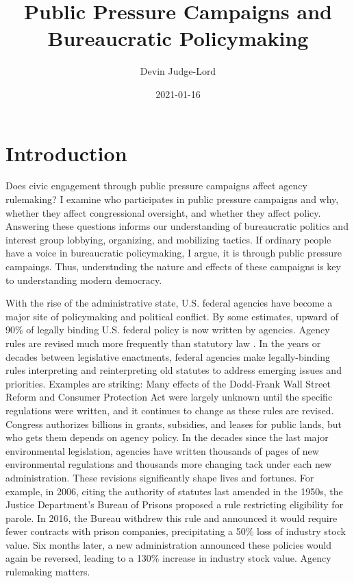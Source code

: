 \documentclass[
]{book}
\title{Public Pressure Campaigns and Bureaucratic Policymaking}
\author{Devin Judge-Lord}
\date{2021-01-16}
\begin{document}
\maketitle

{
\setcounter{tocdepth}{1}
\tableofcontents
}
\hypertarget{introduction}{%
\chapter*{Introduction}\label{introduction}}

Does civic engagement through public pressure campaigns affect agency rulemaking? I examine who participates in public pressure campaigns and why, whether they affect congressional oversight, and whether they affect policy. Answering these questions informs our understanding of bureaucratic politics and interest group lobbying, organizing, and mobilizing tactics. If ordinary people have a voice in bureaucratic policymaking, I argue, it is through public pressure campaings. Thus, understnding the nature and effects of these campaigns is key to understanding modern democracy.

With the rise of the administrative state, U.S. federal agencies have
become a major site of policymaking and political conflict. By some
estimates, upward of 90\% of legally binding U.S. federal policy is now
written by agencies. Agency rules are revised much more frequently than
statutory law \citep{Wagner2017}. In the years or decades between
legislative enactments, federal agencies make legally-binding rules
interpreting and reinterpreting old statutes to address emerging issues
and priorities. Examples are striking: Many effects of the Dodd-Frank Wall
Street Reform and Consumer Protection Act were largely unknown until the
specific regulations were written, and it continues to change as these
rules are revised. Congress authorizes billions in grants, subsidies, and
leases for public lands, but who gets them depends on agency policy. In
the decades since the last major environmental legislation, agencies
have written thousands of pages of new environmental regulations and
thousands more changing tack under each new administration. These
revisions significantly shape lives and fortunes. For example, in 2006,
citing the authority of statutes last amended in the 1950s, the Justice
Department's Bureau of Prisons proposed a rule restricting eligibility
for parole. In 2016, the Bureau withdrew this rule and announced it
would require fewer contracts with prison companies,
precipitating a 50\% loss of industry stock value. Six months later, a
new administration announced these policies would again be reversed,
leading to a 130\% increase in industry stock value. Agency rulemaking
matters.
\end{document}
